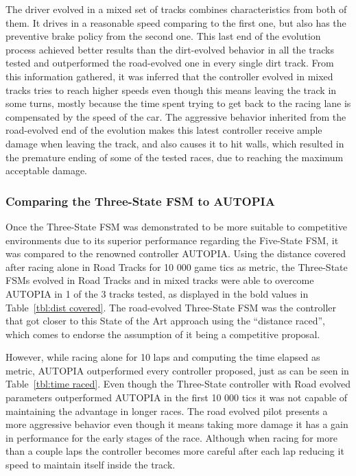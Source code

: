 	The driver evolved in a mixed set of tracks combines characteristics from both of them. It drives in a reasonable speed comparing to the first one, but also has the preventive brake policy from the second one. This last end of the evolution process achieved better results than the dirt-evolved behavior in all the tracks tested and outperformed the road-evolved one in every single dirt track. From this information gathered, it was inferred that the controller evolved in mixed tracks tries to reach higher speeds even though this means leaving the track in some turns, mostly because the time spent trying to get back to the racing lane is compensated by the speed of the car. The aggressive behavior inherited from the road-evolved end of the evolution makes this latest controller receive ample damage when leaving the track, and also causes it to hit walls, which resulted in the premature ending of some of the tested races, due to reaching the maximum acceptable damage.
	
\subsubsection{Comparing the Three-State FSM to AUTOPIA} \label{subsubsec:CompAUTOPIA}

	Once the Three-State FSM was demonstrated to be more suitable to competitive environments due to its superior performance regarding the Five-State FSM, it was compared to the renowned controller AUTOPIA. Using the distance covered after racing alone in Road Tracks for 10 000 game tics as metric, the Three-State FSMs evolved in Road Tracks and in mixed tracks were able to overcome AUTOPIA in 1 of the 3 tracks tested, as displayed in the bold values in Table~\ref{tbl:dist covered}. The road-evolved Three-State FSM was the controller that got closer to this State of the Art approach using the ``distance raced'', which comes to endorse the assumption of it being a competitive proposal.
	
	However, while racing alone for 10 laps and computing the time elapsed as metric, AUTOPIA outperformed every controller proposed, just as can be seen in Table~\ref{tbl:time raced}. Even though the Three-State controller with Road evolved parameters outperformed AUTOPIA in the first 10 000 tics it was not capable of maintaining the advantage in longer races. The road evolved pilot presents a more aggressive behavior even though it means taking more damage it has a gain in performance for the early stages of the race. Although when racing for more than a couple laps the controller becomes more careful after each lap reducing it speed to maintain itself inside the track.
	

